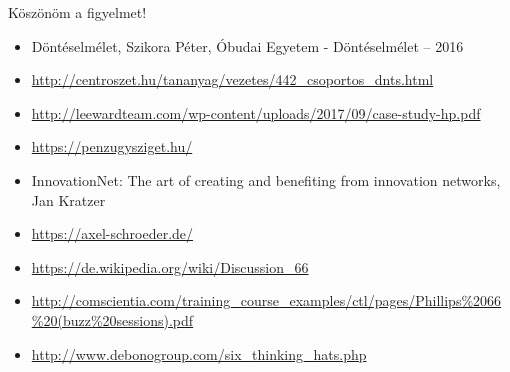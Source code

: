 \documentclass{beamer}
\begin{document}
\begin{frame}
\centering
{\Huge Köszönöm a figyelmet!}
\end{frame}

\begin{footnotesize}
    \begin{itemize}
        \item Döntéselmélet, Szikora Péter, Óbudai Egyetem - Döntéselmélet – 2016
        \item \url{http://centroszet.hu/tananyag/vezetes/442_csoportos_dnts.html}
        \item \url{http://leewardteam.com/wp-content/uploads/2017/09/case-study-hp.pdf}
        \item \url{https://penzugysziget.hu/}
        \item InnovationNet: The art of creating and benefiting from innovation networks, Jan Kratzer
        \item \url{https://axel-schroeder.de/}
        \item \url{https://de.wikipedia.org/wiki/Discussion_66}
        \item \url{http://comscientia.com/training_course_examples/ctl/pages/Phillips\%2066\%20(buzz\%20sessions).pdf}
        \item \url{http://www.debonogroup.com/six_thinking_hats.php}
    \end{itemize}
\end{footnotesize}
\end{document}
